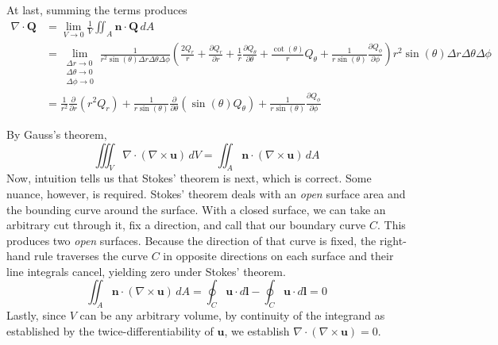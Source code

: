 \documentclass[a4paper]{article}
\begin{document}
At last, summing the terms produces
\begin{align*}
	\nabla \cdot \pmb{Q} & = \lim\limits_{V \to 0}\frac{1}{V}\iint_{A} \pmb{n} \cdot \pmb{Q} \, dA \\
			     & = \lim\limits_{\substack{\Delta r \to 0 \\ \Delta \theta \to 0 \\ \Delta \phi \to 0}}\frac{1}{r^{2}\sin\!\left(\theta\right)\Delta r \Delta \theta \Delta \phi}\!\left( \frac{2Q_{r}}{r} + \frac{\partial Q_{r}}{\partial r} + \frac{1}{r}\frac{\partial Q_{\theta}}{\partial \theta} + \frac{\cot\!\left(\theta\right)}{r}Q_{\theta} + \frac{1}{r \sin\!\left(\theta\right)}\frac{\partial Q_{\phi}}{\partial \phi} \right)r^{2}\sin\!\left(\theta\right)\Delta r \Delta \theta \Delta \phi \\ 
			     & = \frac{1}{r^{2}}\frac{\partial }{\partial r}\!\left( r^{2}Q_{r} \right) + \frac{1}{r \sin\!\left( \theta \right)}\frac{\partial }{\partial \theta}\!\left( \sin\!\left(\theta\right)Q_{\theta} \right) + \frac{1}{r \sin\!\left(\theta\right)}\frac{\partial Q_{\phi}}{\partial \phi}
\end{align*}


By  Gauss's theorem,
\[
	\iiint_{V}\nabla \cdot \!\left( \nabla \times \pmb{u} \right) \, dV = \iint_{A}\pmb{n} \cdot \!\left( \nabla \times \pmb{u} \right) \, dA  
\]
Now, intuition tells us that Stokes' theorem is next, which is correct. Some nuance, however, is required. Stokes' theorem deals with an \textit{open} surface area and the bounding curve around the surface. With a closed surface, we can take an arbitrary cut through it, fix a direction, and call that our boundary curve \( C \). This produces two \textit{open} surfaces. Because the direction of that curve is fixed, the right-hand rule traverses the curve \( C \) in opposite directions on each surface and their line integrals cancel, yielding zero under Stokes' theorem. 
\[
	\iint_{A} \pmb{n} \cdot \!\left( \nabla \times \pmb{u} \right) \, dA = \oint_{C} \pmb{u} \cdot d \pmb{l} - \oint_{C} \pmb{u} \cdot d \pmb{l} = 0 
\]
Lastly, since \( V \) can be any arbitrary volume, by continuity of the integrand as established by the twice-differentiability of \( \pmb{u} \), we establish \( \nabla \cdot \!\left( \nabla \times \pmb{u} \right) = 0 \).
\end{document}
